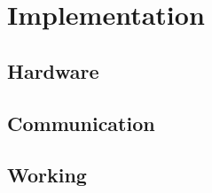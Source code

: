 \section{Implementation}

\subsection{Hardware}

\subsection{Communication}

\subsection{Working}




